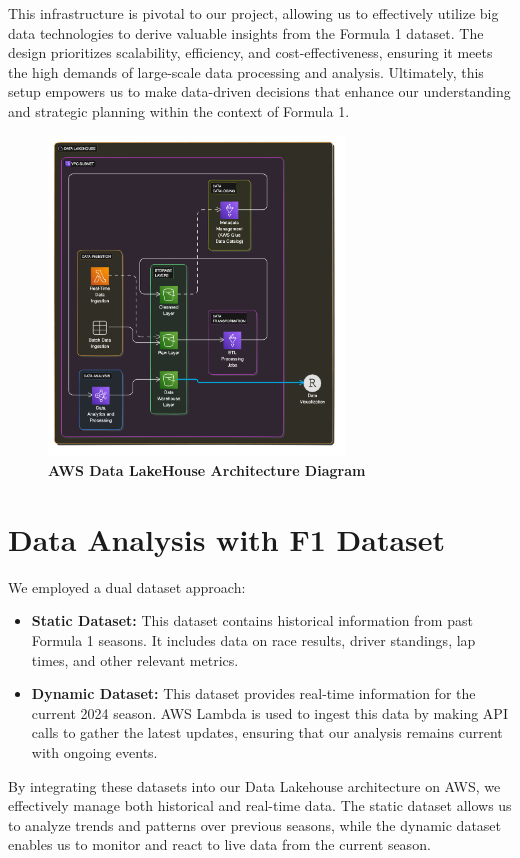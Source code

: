 \documentclass{article}
\begin{document}
This infrastructure is pivotal to our project, allowing us to effectively utilize big data technologies to derive valuable insights from the Formula 1 dataset. The design prioritizes scalability, efficiency, and cost-effectiveness, ensuring it meets the high demands of large-scale data processing and analysis. Ultimately, this setup empowers us to make data-driven decisions that enhance our understanding and strategic planning within the context of Formula 1.

\begin{figure}[H]
    \centering
    \includegraphics[width=0.7\textwidth]{images/arch/AWS-GridGuru-LakeHouseArchitecture.png}
    \caption{\textbf{AWS Data LakeHouse Architecture Diagram}}
\end{figure}

\section{Data Analysis with F1 Dataset}

We employed a dual dataset approach:

\begin{itemize}
    \item \textbf{Static Dataset:} This dataset contains historical information from past Formula 1 seasons. It includes data on race results, driver standings, lap times, and other relevant metrics.
    \item \textbf{Dynamic Dataset:} This dataset provides real-time information for the current 2024 season. AWS Lambda is used to ingest this data by making API calls to gather the latest updates, ensuring that our analysis remains current with ongoing events.
\end{itemize}
By integrating these datasets into our Data Lakehouse architecture on AWS, we effectively manage both historical and real-time data. The static dataset allows us to analyze trends and patterns over previous seasons, while the dynamic dataset enables us to monitor and react to live data from the current season.
\end{document}
